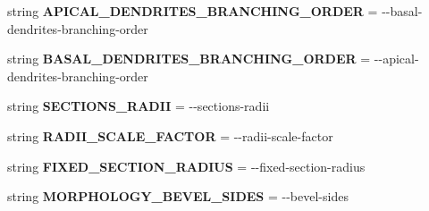 \begin{DoxyCompactItemize}
\item 
string {\bfseries A\+P\+I\+C\+A\+L\+\_\+\+D\+E\+N\+D\+R\+I\+T\+E\+S\+\_\+\+B\+R\+A\+N\+C\+H\+I\+N\+G\+\_\+\+O\+R\+D\+ER} = \textquotesingle{}-\/-\/basal-\/dendrites-\/branching-\/order\textquotesingle{}\hypertarget{classmeshy_1_1neuromorphovis_1_1interface_1_1cli_1_1args_1_1Args_a0f5f71ec087c026b32c0172f26103d6f}{}\label{classmeshy_1_1neuromorphovis_1_1interface_1_1cli_1_1args_1_1Args_a0f5f71ec087c026b32c0172f26103d6f}

\item 
string {\bfseries B\+A\+S\+A\+L\+\_\+\+D\+E\+N\+D\+R\+I\+T\+E\+S\+\_\+\+B\+R\+A\+N\+C\+H\+I\+N\+G\+\_\+\+O\+R\+D\+ER} = \textquotesingle{}-\/-\/apical-\/dendrites-\/branching-\/order\textquotesingle{}\hypertarget{classmeshy_1_1neuromorphovis_1_1interface_1_1cli_1_1args_1_1Args_a178fd412dfaf3ea8778d14a8877b35ff}{}\label{classmeshy_1_1neuromorphovis_1_1interface_1_1cli_1_1args_1_1Args_a178fd412dfaf3ea8778d14a8877b35ff}

\item 
string {\bfseries S\+E\+C\+T\+I\+O\+N\+S\+\_\+\+R\+A\+D\+II} = \textquotesingle{}-\/-\/sections-\/radii\textquotesingle{}\hypertarget{classmeshy_1_1neuromorphovis_1_1interface_1_1cli_1_1args_1_1Args_aa6734d94bcb3853f1d70462045e39f23}{}\label{classmeshy_1_1neuromorphovis_1_1interface_1_1cli_1_1args_1_1Args_aa6734d94bcb3853f1d70462045e39f23}

\item 
string {\bfseries R\+A\+D\+I\+I\+\_\+\+S\+C\+A\+L\+E\+\_\+\+F\+A\+C\+T\+OR} = \textquotesingle{}-\/-\/radii-\/scale-\/factor\textquotesingle{}\hypertarget{classmeshy_1_1neuromorphovis_1_1interface_1_1cli_1_1args_1_1Args_ac0a2a39776fff5a8d10a68cd7d3e2214}{}\label{classmeshy_1_1neuromorphovis_1_1interface_1_1cli_1_1args_1_1Args_ac0a2a39776fff5a8d10a68cd7d3e2214}

\item 
string {\bfseries F\+I\+X\+E\+D\+\_\+\+S\+E\+C\+T\+I\+O\+N\+\_\+\+R\+A\+D\+I\+US} = \textquotesingle{}-\/-\/fixed-\/section-\/radius\textquotesingle{}\hypertarget{classmeshy_1_1neuromorphovis_1_1interface_1_1cli_1_1args_1_1Args_adb3db6e99912d6d31b587840415c5633}{}\label{classmeshy_1_1neuromorphovis_1_1interface_1_1cli_1_1args_1_1Args_adb3db6e99912d6d31b587840415c5633}

\item 
string {\bfseries M\+O\+R\+P\+H\+O\+L\+O\+G\+Y\+\_\+\+B\+E\+V\+E\+L\+\_\+\+S\+I\+D\+ES} = \textquotesingle{}-\/-\/bevel-\/sides\textquotesingle{}\hypertarget{classmeshy_1_1neuromorphovis_1_1interface_1_1cli_1_1args_1_1Args_a2273d08a6d555d6a8610d886c0af67aa}{}\label{classmeshy_1_1neuromorphovis_1_1interface_1_1cli_1_1args_1_1Args_a2273d08a6d555d6a8610d886c0af67aa}


\end{DoxyCompactItemize}
